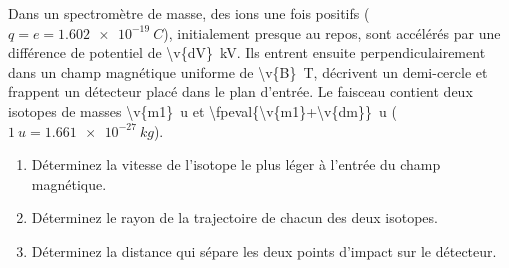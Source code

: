 Dans un spectromètre de masse, des ions une fois positifs ($q = e = \qty{1.602e-19}{C}$), initialement presque au repos, sont accélérés par une différence de potentiel de \qty{\v{dV}}{kV}. Ils entrent ensuite perpendiculairement dans un champ magnétique uniforme de \qty{\v{B}}{T}, décrivent un demi-cercle et frappent un détecteur placé dans le plan d'entrée. Le faisceau contient deux isotopes de masses \qty{\v{m1}}{u} et \qty{\fpeval{\v{m1}+\v{dm}}}{u} ($\qty{1}{u} = \qty{1.661e-27}{kg}$).

\begin{enumerate}[label=\alph*)]
    \item Déterminez la vitesse de l'isotope le plus léger à l'entrée du champ magnétique.
    \item Déterminez le rayon de la trajectoire de chacun des deux isotopes.
    \item Déterminez la distance qui sépare les deux points d'impact sur le détecteur.
\end{enumerate}
